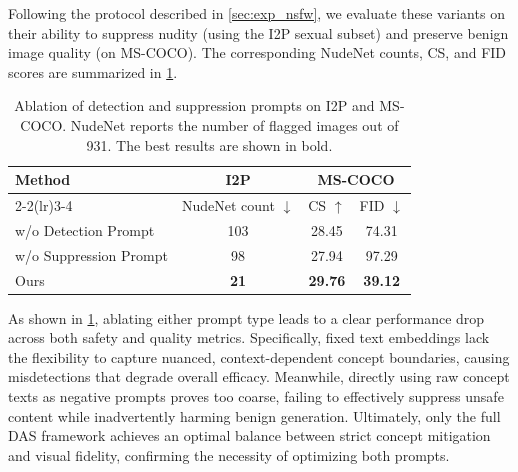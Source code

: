 Following the protocol described in \cref{sec:exp_nsfw}, we evaluate these variants on their ability to suppress nudity (using the I2P sexual subset) and preserve benign image quality (on MS-COCO). The corresponding NudeNet counts, CS, and FID scores are summarized in \cref{tab:prompt_ablation}.

\begin{table}[htbp]
    \centering
    \small
    \setlength{\tabcolsep}{3pt}
    \caption{Ablation of detection and suppression prompts on I2P and MS-COCO. NudeNet reports the number of flagged images out of 931. The best results are shown in bold.}
    \label{tab:prompt_ablation}
    \begin{tabular}{@{}lccc@{}}
        \toprule
        Method & I2P & \multicolumn{2}{c}{MS-COCO} \\
        \cmidrule(lr){2-2}\cmidrule(lr){3-4}
        & NudeNet count $\downarrow$ & CS $\uparrow$ & FID $\downarrow$ \\
        \midrule
        w/o Detection Prompt & 103 & 28.45 & 74.31 \\
        w/o Suppression Prompt & 98 & 27.94 & 97.29 \\
        \midrule
        Ours & \textbf{21} & \textbf{29.76} & \textbf{39.12} \\
        \bottomrule
    \end{tabular}
\end{table}

As shown in \cref{tab:prompt_ablation}, ablating either prompt type leads to a clear performance drop across both safety and quality metrics. 
Specifically, fixed text embeddings lack the flexibility to capture nuanced, context-dependent concept boundaries, causing misdetections that degrade overall efficacy. 
Meanwhile, directly using raw concept texts as negative prompts proves too coarse, failing to effectively suppress unsafe content while inadvertently harming benign generation. 
Ultimately, only the full DAS framework achieves an optimal balance between strict concept mitigation and visual fidelity, confirming the necessity of optimizing both prompts.

\FloatBarrier


